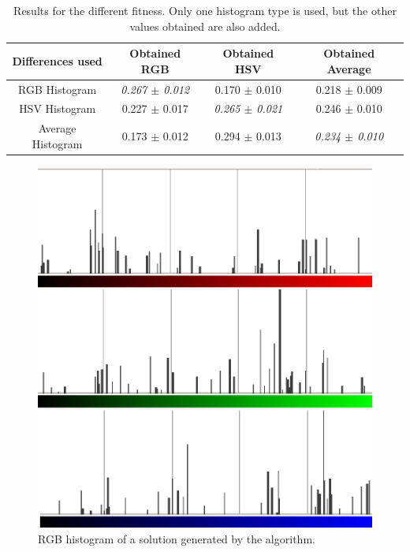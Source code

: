 \documentclass[a4paper,twoside]{article}
\begin{document}
\begin{table}
\centering
\caption{Results for the different fitness. Only one histogram type is used, but the other values obtained are also added.}
\begin{tabular}{|c|c|c|c|} \hline
Differences used & Obtained RGB      		& Obtained HSV  & Obtained Average \\ \hline
RGB Histogram    & {\em 0.267 $\pm$ 0.012}	& 0.170 $\pm$ 0.010 	& 0.218 $\pm$ 0.009	\\ \hline
HSV Histogram    & 0.227 $\pm$ 0.017	& {\em 0.265 $\pm$ 0.021}	& 0.246 $\pm$ 0.010 \\ \hline
Average Histogram& 0.173 $\pm$ 0.012	& 0.294 $\pm$ 0.013	& {\em 0.234 $\pm$ 0.010} \\ \hline
\end{tabular}
\label{tab:results}
\end{table}

\begin{figure}
\centering
   \includegraphics[scale =0.6] {images/individuohist.eps}
\caption{RGB histogram of a solution generated by the algorithm.}
\label{fig:histoind}
\end{figure}
\end{document}
